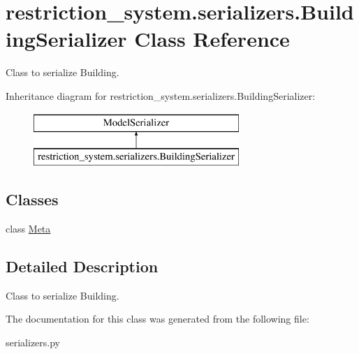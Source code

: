 \hypertarget{classrestriction__system_1_1serializers_1_1BuildingSerializer}{}\section{restriction\+\_\+system.\+serializers.\+Building\+Serializer Class Reference}
\label{classrestriction__system_1_1serializers_1_1BuildingSerializer}


Class to serialize Building.  


Inheritance diagram for restriction\+\_\+system.\+serializers.\+Building\+Serializer\+:\begin{figure}[H]
\begin{center}
\leavevmode
\includegraphics[height=2.000000cm]{classrestriction__system_1_1serializers_1_1BuildingSerializer}
\end{center}
\end{figure}
\subsection*{Classes}
\begin{DoxyCompactItemize}
\item 
class \hyperlink{classrestriction__system_1_1serializers_1_1BuildingSerializer_1_1Meta}{Meta}
\end{DoxyCompactItemize}


\subsection{Detailed Description}
Class to serialize Building. 

The documentation for this class was generated from the following file\+:\begin{DoxyCompactItemize}
\item 
serializers.\+py\end{DoxyCompactItemize}
